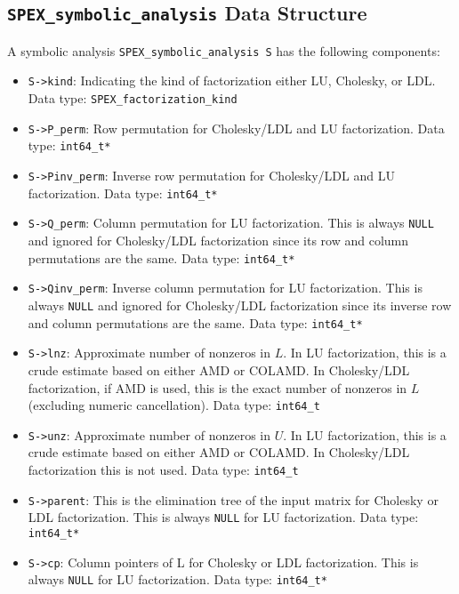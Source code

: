 \documentclass[12pt,oneside]{book}
\theoremstyle{definition}
\begin{document}
\subsection{\texttt{SPEX\_symbolic\_analysis} Data Structure} \label{ss:SPEX_symbolic_struct}
A symbolic analysis \verb|SPEX_symbolic_analysis S| has the following components:

\begin{itemize}
\item \verb|S->kind|: Indicating the kind of factorization either LU, Cholesky, or LDL. Data type: \verb|SPEX_factorization_kind|

\item \verb|S->P_perm|: Row permutation for Cholesky/LDL and LU factorization. Data type: \verb|int64_t*|

\item \verb|S->Pinv_perm|: Inverse row permutation for Cholesky/LDL and LU factorization. Data type: \verb|int64_t*|

\item \verb|S->Q_perm|: Column permutation for LU factorization. This is always \verb|NULL| and ignored for Cholesky/LDL factorization since its row and column permutations are the same. Data type: \verb|int64_t*|

\item \verb|S->Qinv_perm|: Inverse column permutation for LU factorization. This is always \verb|NULL| and ignored for Cholesky/LDL factorization since its inverse row and column permutations are the same. Data type: \verb|int64_t*|

\item \verb|S->lnz|: Approximate number of nonzeros in $L$. In LU factorization, this is a crude estimate based on either AMD or COLAMD. In Cholesky/LDL factorization, if AMD is used, this is the exact number of nonzeros in $L$ (excluding numeric cancellation). Data type: \verb|int64_t|

\item \verb|S->unz|: Approximate number of nonzeros in $U$. In LU factorization, this is a crude estimate based on either AMD or COLAMD. In Cholesky/LDL factorization this is not used. Data type: \verb|int64_t|


\item \verb|S->parent|: This is the elimination tree of the input matrix for Cholesky or LDL factorization. This is always \verb|NULL| for LU factorization. Data type: \verb|int64_t*|

\item \verb|S->cp|: Column pointers of L for Cholesky or LDL factorization. This is always \verb|NULL| for LU factorization. Data type: \verb|int64_t*|

\end{itemize}
\end{document}
